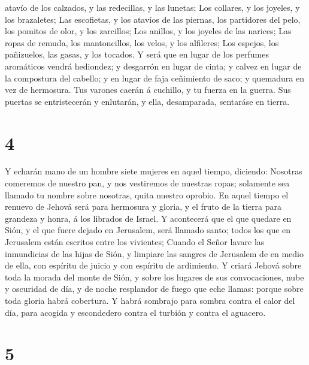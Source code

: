 atavío de los calzados, y las redecillas, y las lunetas; 
Los collares, y los joyeles, y los brazaletes;  Las
escofietas, y los atavíos de las piernas, los partidores del pelo, los
pomitos de olor, y los zarcillos;  Los anillos, y los
joyeles de las narices;  Las ropas de remuda, los
mantoncillos, los velos, y los alfileres;  Los espejos,
los pañizuelos, las gasas, y los tocados.  Y será que en
lugar de los perfumes aromáticos vendrá hediondez; y desgarrón en lugar
de cinta; y calvez en lugar de la compostura del cabello; y en lugar de
faja ceñimiento de saco; y quemadura en vez de hermosura.
 Tus varones caerán á cuchillo, y tu fuerza en la guerra.
 Sus puertas se entristecerán y enlutarán, y ella,
desamparada, sentaráse en tierra.

\hypertarget{section-3}{%
\section{4}\label{section-3}}

 Y echarán mano de un hombre siete mujeres en aquel
tiempo, diciendo: Nosotras comeremos de nuestro pan, y nos vestiremos de
nuestras ropas; solamente sea llamado tu nombre sobre nosotras, quita
nuestro oprobio.  En aquel tiempo el renuevo de Jehová
será para hermosura y gloria, y el fruto de la tierra para grandeza y
honra, á los librados de Israel.  Y acontecerá que el que
quedare en Sión, y el que fuere dejado en Jerusalem, será llamado santo;
todos los que en Jerusalem están escritos entre los vivientes;
 Cuando el Señor lavare las inmundicias de las hijas de
Sión, y limpiare las sangres de Jerusalem de en medio de ella, con
espíritu de juicio y con espíritu de ardimiento.  Y criará
Jehová sobre toda la morada del monte de Sión, y sobre los lugares de
sus convocaciones, nube y oscuridad de día, y de noche resplandor de
fuego que eche llamas: porque sobre toda gloria habrá cobertura.
 Y habrá sombrajo para sombra contra el calor del día,
para acogida y escondedero contra el turbión y contra el aguacero.

\hypertarget{section-4}{%
\section{5}\label{section-4}}


